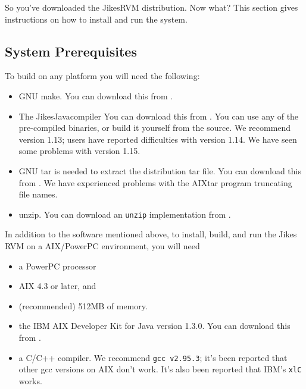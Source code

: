 So you've downloaded the Jikes\trademark RVM distribution.  Now what?
This section gives 
instructions on how to install and run the system.

\subsection{System Prerequisites}
To build on any platform you will need the following:
\begin{itemize}
\item GNU make. You can download this from
\xlink{{\tt \gnuMakeURL}} {\gnuMakeURL}.

\item The Jikes\trademark Java\trademark compiler 
You can download this from
\xlink{{\tt \jikesURL}} {\jikesURL}.
You can use any of the pre-compiled binaries, or build it yourself from the
source. We recommend version 1.13; users have reported difficulties with 
version 1.14.  We have seen some problems with version 1.15.

\item GNU tar is needed to extract the distribution tar file.  
You can download this from
\xlink{{\tt \gnuTarURL}} {\gnuTarURL}.
We have experienced problems with the AIX\AIXTMFootnote tar program
truncating file names. 

\item unzip. 
You can download an {\tt unzip} implementation from
\xlink{{\tt \unzipURL}} {\unzipURL}.

\end{itemize}


In addition to the software mentioned above, to install, build, and
run the Jikes RVM on a AIX/PowerPC environment, 
you will need 
\begin{itemize}
\item a PowerPC processor
\item AIX 4.3 or later, and
\item (recommended) 512MB of memory.
\item the IBM AIX Developer Kit for Java version 1.3.0.  You can
download this from \xlink{{\tt \AIXJdkURL}} {\AIXJdkURL}. 
\item a C/C++ compiler.  We recommend {\tt gcc v2.95.3}; it's been
reported that other gcc versions on AIX don't work.  It's also been
reported that IBM's {\tt xlC} works.
\end{itemize}

